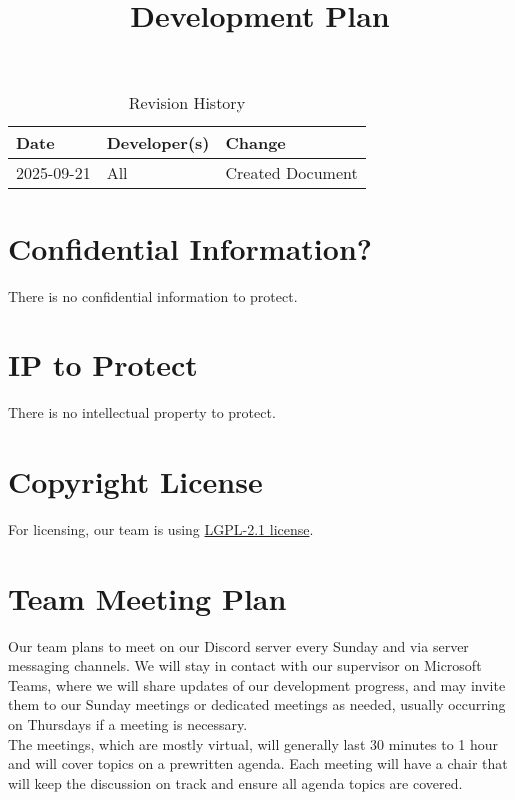 \documentclass{article}
\title{Development Plan\\\progname}
\author{\authname}
\date{}
\begin{document}
\maketitle

\begin{table}[hp]
\caption{Revision History} \label{TblRevisionHistory}
\begin{tabularx}{\textwidth}{llX}
\toprule
\textbf{Date} & \textbf{Developer(s)} & \textbf{Change}\\
\midrule
2025-09-21 & All & Created Document\\
\bottomrule
\end{tabularx}
\end{table}

\newpage{}

\section{Confidential Information?}

There is no confidential information to protect.

\section{IP to Protect}

There is no intellectual property to protect.

\section{Copyright License}

For licensing, our team is using \href{https://github.com/felix-hurst/Ad-Natura/blob/main/LICENSE}{LGPL-2.1 license}.

\section{Team Meeting Plan}


Our team plans to meet on our Discord server every Sunday and via server messaging channels. We will stay in contact with our supervisor on Microsoft Teams, where we will share updates of our development progress, and may invite them to our Sunday meetings or dedicated meetings as needed, usually occurring on Thursdays if a meeting is necessary. \\

The meetings, which are mostly virtual, will generally last 30 minutes to 1 hour and will cover topics on a prewritten agenda. Each meeting will have a chair that will keep the discussion on track and ensure all agenda topics are covered. \\
\end{document}
